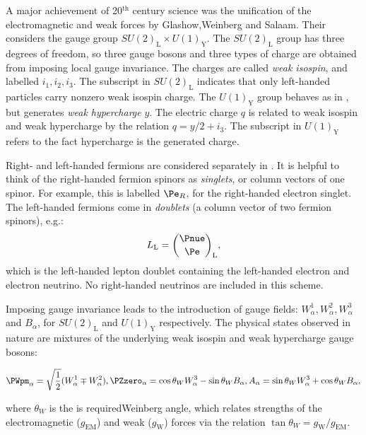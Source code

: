 A major achievement of 20$^{\textrm{th}}$ century science was the unification of the electromagnetic and weak forces by Glashow,Weinberg and Salaam. %
Their \EWT considers the gauge group $SU(2)_{\textrm{L}} \times U(1)_{\textrm{Y}}$. The $SU(2)_{\textrm{L}}$ group has three degrees of freedom, so three gauge bosons and three types of charge are obtained from imposing local gauge invariance. The charges are called \emph{weak isospin}, and labelled $i_1, i_2, i_3$. The subscript in $SU(2)_{\textrm{L}}$ indicates that only left-handed particles carry nonzero weak isospin charge. The $U(1)_{\textrm{Y}}$ group behaves as in \QED, but generates \emph{weak hypercharge} $y$. The electric charge $q$ is related to weak isospin and weak hypercharge by the relation $q=y/2 + i_3$. The subscript in $U(1)_{\textrm{Y}}$ refers to the fact hypercharge is the generated charge.

Right- and left-handed fermions are considered separately in \EWT. It is helpful to think of the right-handed fermion spinors as \emph{singlets}, or column vectors of one spinor. For example, this is labelled $\Pe_{R}$, for the right-handed electron singlet.
The left-handed fermions come in \emph{doublets} (a column vector of two fermion spinors), e.g.:
$$
L_{\textrm{L}}=\binom{\Pnue}{\Pe}_{\textrm{L}},
$$
which is the left-handed lepton doublet containing the left-handed electron and electron neutrino. No right-handed neutrinos are included in this scheme. 

Imposing gauge invariance leads to the introduction of gauge fields: $W_{\alpha}^{1},W_{\alpha}^{2},W_{\alpha}^{3}$ and $B_{\alpha}$, for $SU(2)_{\textrm{L}}$ and $U(1)_{\textrm{Y}}$ respectively. The physical states observed in nature are mixtures of the underlying weak isospin and weak hypercharge gauge bosons:

\begin{equation}
\label{eq:th:electroweak_gauge_bosons}
\PWpm_{\alpha} = \sqrt{\frac{1}{2}}(W_{\alpha}^{1} \mp W_{\alpha}^{2}) ,\\
\PZzero_{\alpha} = \cos \theta_{W} W_{\alpha}^{3} - \sin \theta_{W} B_{\alpha} ,\\
A_{\alpha} = \sin \theta_{W} W_{\alpha}^{3} + \cos \theta_{W} B_{\alpha} ,
\end{equation}

where $\theta_{W}$ is the  is requiredWeinberg angle, which relates strengths of the electromagnetic ($g_{\textrm{EM}}$) and weak ($g_{\textrm{W}}$) forces via the relation $\tan \theta_{W} = g_{\textrm{W}} /g_{\textrm{EM}}$.

